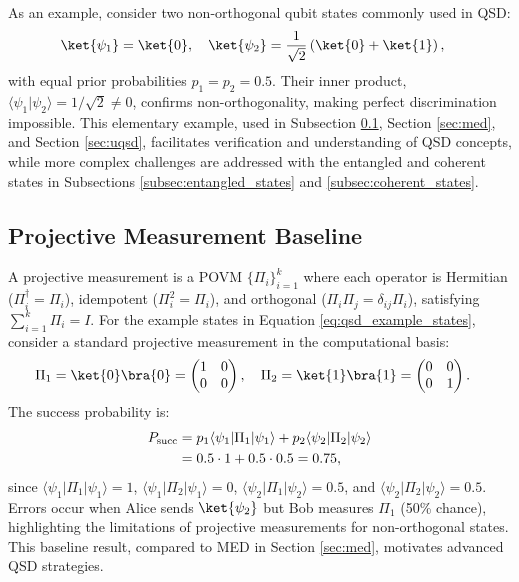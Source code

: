 As an example, consider two non-orthogonal qubit states commonly used in QSD:
\begin{align}
    \ket{\psi_1} & = \ket{0}, \quad \ket{\psi_2} = \frac{1}{\sqrt{2}} \left( \ket{0} + \ket{1} \right), \label{eq:qsd_example_states}
\end{align}
with equal prior probabilities \(p_1 = p_2 = 0.5\).
Their inner product, \(\langle \psi_1 | \psi_2 \rangle = 1/\sqrt{2} \neq 0\),
confirms non-orthogonality, making perfect discrimination impossible.
This elementary example, used in Subsection \ref{subsec:proj_meas}, Section
\ref{sec:med}, and Section \ref{sec:uqsd},
facilitates verification and understanding of QSD concepts, while more complex
challenges are addressed with the entangled and coherent states in
Subsections \ref{subsec:entangled_states} and \ref{subsec:coherent_states}.

\subsection{Projective Measurement Baseline}
\label{subsec:proj_meas}
A projective measurement is a POVM \(\{ \Pi_i \}_{i=1}^k\) where each operator
is Hermitian (\(\Pi_i^\dagger = \Pi_i\)), idempotent (\(\Pi_i^2 = \Pi_i\)),
and orthogonal (\(\Pi_i \Pi_j = \delta_{ij} \Pi_i\)), satisfying \(\sum_{i=1}^k \Pi_i = I\).
For the example states in Equation \ref{eq:qsd_example_states}, consider a
standard projective measurement in the computational basis:
\begin{align}
    \Pi_1 & = \ket{0}\bra{0} = \begin{pmatrix} 1 & 0 \\ 0 & 0 \end{pmatrix}, \quad \Pi_2 = \ket{1}\bra{1} = \begin{pmatrix} 0 & 0 \\ 0 & 1 \end{pmatrix}. \label{eq:proj_operators}
\end{align}
The success probability is:
\begin{align}
    P_{\mathrm{succ}} & = p_1 \langle \psi_1 | \Pi_1 | \psi_1 \rangle + p_2 \langle \psi_2 | \Pi_2 | \psi_2 \rangle \notag \\
           & = 0.5 \cdot 1 + 0.5 \cdot 0.5 = 0.75, \label{eq:proj_psucc}
\end{align}
since \(\langle \psi_1 | \Pi_1 | \psi_1 \rangle = 1\), \(\langle \psi_1 | \Pi_2 | \psi_1 \rangle = 0\), \(\langle \psi_2 | \Pi_1 | \psi_2 \rangle = 0.5\), and \(\langle \psi_2 | \Pi_2 | \psi_2 \rangle = 0.5\).
Errors occur when Alice sends \(\ket{\psi_2}\) but Bob measures \(\Pi_1\) (50\% chance),
highlighting the limitations of projective measurements for non-orthogonal states.
This baseline result, compared to MED in Section \ref{sec:med}, motivates advanced QSD strategies.

